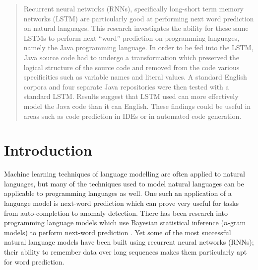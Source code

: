 \documentclass{article}
\begin{document}
 


\begin{abstract} 
Recurrent neural networks (RNNs), specifically long-short term memory 
networks (LSTM) are particularly good at performing next word prediction 
on natural languages. This research 
investigates the ability for these same LSTMs to perform next “word” 
prediction on programming languages, namely the Java programming 
language. In order to be fed into the LSTM, Java source code had to 
undergo a transformation which preserved the logical structure of the 
source code and removed from the code various specificities such as 
variable names and literal values. A standard English corpora and four 
separate Java repositories were then tested with a standard LSTM. 
Results suggest that LSTM used can more effectively model the Java code 
than it can English. These findings could be useful in areas such as 
code prediction in IDEs or in automated code generation.
\end{abstract} 

\section{Introduction}
\label{submission}

Machine learning techniques of language modelling are often applied
to natural languages, but many of the techniques used to model
natural languages can be applicable to programming languages as well.
One such an application of a language model is next-word prediction
which can prove very useful for tasks from auto-completion to anomaly
detection. There has been research into programming language models
which use Bayesian statistical inference ($n$-gram models)
to perform next-word prediction \cite{Allamanis}.
Yet some of the most successful natural language models have been
built using recurrent neural networks (RNNs); their ability to
remember data over long sequences makes them particularly apt for
word prediction.
\end{document}
